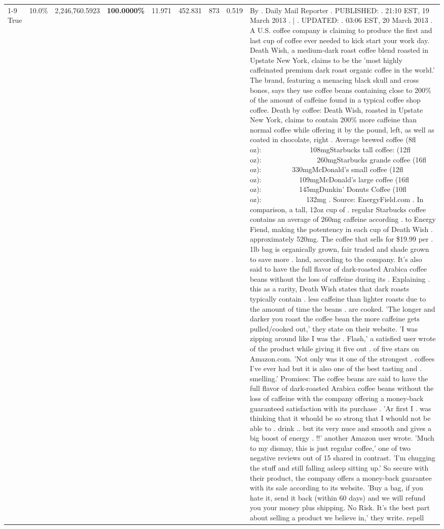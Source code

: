 \begin{table}[H]
{\begin{tabular}{lllrlllll}
\cline{1-9}
True & 10.0\% & 2,246,760.5923 & \bfseries \color{red} 100.0000\% & 11.971 & 452.831 & 873 & 0.519 & By . Daily Mail Reporter . PUBLISHED: . 21:10 EST, 19 March 2013 . | . UPDATED: . 03:06 EST, 20 March 2013 . A U.S. coffee company is claiming to produce the first and last cup of coffee ever needed to kick start your work day. Death Wish, a medium-dark roast coffee blend roasted in Upstate New York, claims to be the 'most highly caffeinated premium dark roast organic coffee in the world.' The brand, featuring a menacing black skull and cross bones, says they use coffee beans containing close to 200\% of the amount of caffeine found in a typical coffee shop coffee. Death by coffee: Death Wish, roasted in Upstate New York, claims to contain 200\% more caffeine than normal coffee while offering it by the pound, left, as well as coated in chocolate, right . Average brewed coffee (8fl oz):              108mgStarbucks tall coffee: (12fl oz):                260mgStarbucks grande coffee (16fl oz):         330mgMcDonald's small coffee (12fl oz):           109mgMcDonald's large coffee (16fl oz):           145mgDunkin' Donuts Coffee (10fl oz):             132mg . Source: EnergyField.com . In comparison, a tall, 12oz cup of . regular Starbucks coffee contains an average of 260mg caffeine according . to Energy Fiend, making the potentency in each cup of Death Wish . approximately 520mg. The coffee that sells for \$19.99 per . 1lb bag is organically grown, fair traded and shade grown to save more . land, according to the company. It's also said to have the full flavor of dark-roasted Arabica coffee beans without the loss of caffeine during its . Explaining . this as a rarity, Death Wish states that dark roasts typically contain . less caffeine than lighter roasts due to the amount of time the beans . are cooked. 'The longer and darker you roast the coffee bean the more caffeine gets pulled/cooked out,' they state on their website. 'I was zipping around like I was the . Flash,' a satisfied user wrote of the product while giving it five out . of five stars on Amazon.com. 'Not only was it one of the strongest . coffees I've ever had but it is also one of the best tasting and . smelling.’ Promises: The coffee beans are said to have the full flavor of dark-roasted Arabica coffee beans without the loss of caffeine with the company offering a money-back guaranteed satisfaction with its purchase . 'Ar first I . was thinking that it whould be so strong that I whould not be able to . drink .. but its very nuce and smooth and gives a big boost of energy . !!' another Amazon user wrote. 'Much to my dismay, this is just regular coffee,' one of two negative reviews out of 15 shared in contrast. 'I'm chugging the stuff and still falling asleep sitting up.' So secure with their product, the company offers a money-back guarantee with its sale according to its website. 'Buy a bag, if you hate it, send it back (within 60 days) and we will refund you your money plus shipping. No Risk. It’s the best part about selling a product we believe in,' they write. repell \\

\end{tabular}}
\end{table}
